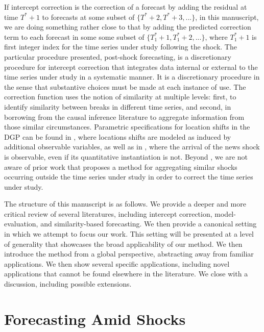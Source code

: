 \documentclass{uiucthesis2021}
\theoremstyle{definition}
\begin{document}
  If intercept correction is the correction of a forecast by adding the residual at time $T^{*}+1$ to forecasts at some subset of $\{T^{*}+2,T^{*}+3,...\}$, in this manuscript, we are doing something rather close to that by adding the predicted correction term to each forecast in some some subset of $\{T_{1}^{*}+1,T_{1}^{*}+2,...\}$, where $T^{*}_{1}+1$ is first integer index for the time series under study following the shock. 
  The particular procedure presented, post-shock forecasting, is a discretionary procedure for intercept correction that integrates data internal or external to the time series under study in a systematic manner.  It is a discretionary procedure in the sense that substantive choices must be made at each instance of use.  The correction function uses the notion of similarity at multiple levels: first, to identify similarity between breaks in different time series, and second, in borrowing from the causal inference literature to aggregate information from those similar circumstances.  Parametric specifications for location shifts in the DGP can be found in \cite[][]{castle2011forecasting}, where locations shifts are modeled as induced by additional observable variables, as well as in \cite[][]{lundquist2024volatility}, where the arrival of the news shock is observable, even if its quantitative instantiation is not.  Beyond \cite[][]{lin2021minimizing}\cite[][]{lundquist2024volatility}, we are not aware of prior work that proposes a method for aggregating similar shocks occurring outside the time series under study in order to correct the time series under study.
  
  
  The structure of this manuscript is as follows.  We provide a deeper and more critical review of several literatures, including intercept correction, model-evaluation, and similarity-based forecasting.  We then provide a canonical setting in which we attempt to focus our work.  This setting will be presented at a level of generality that showcases the broad applicability of our method.  We then introduce the method from a global perspective, abstracting away from familiar applications.  We then show several specific applications, including novel applications that cannot be found elsewhere in the literature.  We close with a discussion, including possible extensions.
  
   \section{Forecasting Amid Shocks}
  
\end{document}
